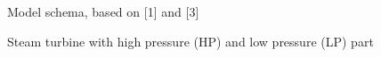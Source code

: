 \documentclass[
  a4paper,
  DIV=11,
  numbers=noendperiod]{scrartcl}
\begin{document}
\begin{figure}


\caption{\label{fig-control_diagram}Model schema, based on {[}1{]} and
{[}3{]}}

\end{figure}%

\begin{figure}


\caption{\label{fig-Steam_turbine_configuration}Steam turbine with high
pressure (HP) and low pressure (LP) part}

\end{figure}%
\end{document}
